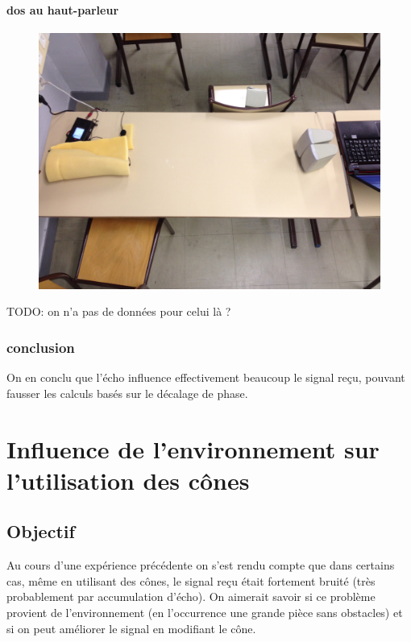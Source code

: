 \documentclass[12pt,a4paper]{report}
\begin{document}
\subsubsection{dos au haut-parleur}

\begin{figure}[H]
\includegraphics[width=\textwidth]{../tests/test_du_protocole/IMG_0924.jpg} 
\end{figure}

TODO: on n'a pas de données pour celui là ?

\subsection{conclusion}
On en conclu que l'écho influence effectivement beaucoup le signal reçu, pouvant fausser les calculs basés sur le décalage de phase.


\chapter{Influence de l'environnement sur l'utilisation des cônes}
\section{Objectif}
Au cours d'une expérience précédente on s'est rendu compte que dans certains cas, même en utilisant des cônes, le signal reçu était fortement bruité (très probablement par accumulation d'écho). On aimerait savoir si ce problème provient de l'environnement (en l'occurrence une grande pièce sans obstacles) et si on peut améliorer le signal en modifiant le cône.
\end{document}
